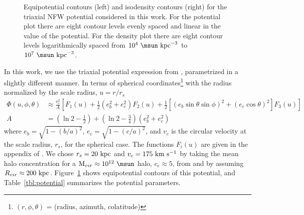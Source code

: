 \begin{figure}[h]
\centering
\caption{Equipotential contours (left) and isodensity contours (right) for the triaxial NFW potential considered in this work. For the potential plot there are eight contour levels evenly spaced and linear in the value of the potential. For the density plot there are eight contour levels logarithmically spaced from $10^4~\msun~{\rm kpc}^{-3}$ to $10^7~\msun~{\rm kpc}^{-3}$.}
\label{fig:potential}
\end{figure}

In this work, we use the triaxial potential expression from \citet{leesuto03}, parametrized in a slightly different manner. In terms of spherical coordinates\footnote{$(r,\phi,\theta)$ = (radius, azimuth, colatitude)} with the radius normalized by the scale radius, $u = r/r_s$
\begin{align}
	\Phi(u,\phi,\theta) &\approx \frac{v_c^2}{A}\left[F_1(u) + \frac{1}{2}(e_b^2 + e_c^2)F_2(u) + \frac{1}{2} [(e_b\sin\theta \sin\phi)^2 + (e_c\cos\theta)^2] F_3(u) \right]\label{eq:potential}\\
	A &= \left(\ln2 - \frac{1}{2}\right) + \left(\ln2-\frac{3}{4}\right) (e_b^2 + e_c^2)
\end{align}
where $e_b = \sqrt{1 - (b/a)^2}$, $e_c = \sqrt{1 - (c/a)^2}$, and $v_c$ is the circular velocity at the scale radius, $r_s$, for the spherical case. The functions $F_i(u)$ are given in the appendix of \cite{leesuto03}. We chose $r_s=20~{\rm kpc}$ and $v_c = 175~{\rm km}~{\rm s}^{-1}$ by taking the mean halo concentration for a ${\rm M}_{vir} \approx 10^{12}~\msun$ halo, $c_e\approx5$, from \cite{jing02} and by assuming $R_{vir}\approx200~{\rm kpc}$. Figure~\ref{fig:potential} shows equipotential contours of this potential, and Table~\ref{tbl:potential} summarizes the potential parameters.


